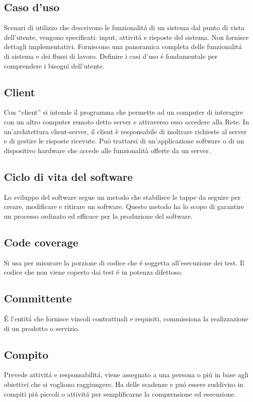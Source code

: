 \documentclass[12pt]{article}
\begin{document}
		\subsection{Caso d'uso}
			Scenari di utilizzo che descrivono le funzionalit\'a di un sistema dal punto di vista dell'utente, vengono specificati: input, attivit\'a e risposte del sistema. Non fornisce dettagli implementativi. Forniscono una panoramica completa delle funzionalit\'a di sistema e dei flussi di lavoro. Definire i casi d'uso \'e fondamentale per comprendere i bisogni dell'utente.
		\subsection{Client} 
			Con “client” si intende il programma che permette ad un computer di interagire con un altro computer remoto detto server e attraverso esso accedere alla Rete. In un'architettura client-server, il client è responsabile di inoltrare richieste al server e di gestire le risposte ricevute. Può trattarsi di un'applicazione software o di un dispositivo hardware che accede alle funzionalità offerte da un server.
		\subsection{Ciclo di vita del software} 
			Lo sviluppo del software segue un metodo che stabilisce le tappe da seguire per creare, modificare e ritirare un software. Questo metodo ha lo scopo di garantire un processo ordinato ed efficace per la produzione del software.
		\subsection{Code coverage}
			Si usa per misurare la porzione di codice che \'e soggetta all'esecuzione dei test. Il codice che non viene coperto dai test \'e in potenza difettoso.
		\subsection{Committente}
			\'E l'entit\'a che fornisce vincoli contrattuali e requisiti, commissiona la realizzazione di un prodotto o servizio.
		\subsection{Compito}
			Prevede attivit\'a e responsabilit\'a, viene assegnato a una persona o pi\'u in base agli obiettivi che si vogliono raggiungere. Ha delle scadenze e pu\'o essere suddiviso in compiti pi\'u piccoli o attivit\'a per semplificarne la comprensione ed esecuzione.
	\clearpage
\end{document}

